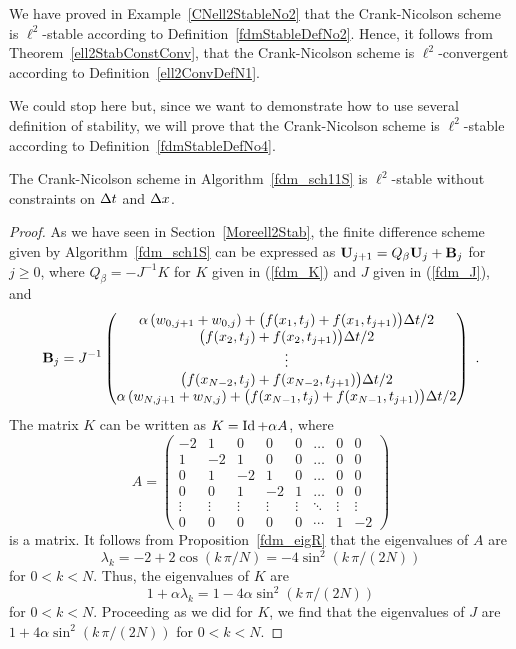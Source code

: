 We have proved in Example~\ref{CNell2StableNo2} that the
Crank-Nicolson scheme is $\ell^2$-stable according to
Definition~\ref{fdmStableDefNo2}.  Hence, it follows from
Theorem~\ref{ell2StabConstConv}, that the Crank-Nicolson scheme is
$\ell^2$-convergent according to Definition~\ref{ell2ConvDefN1}.

We could stop here but, since we want to demonstrate how to use
several definition of stability, we will prove that the Crank-Nicolson
scheme is $\ell^2$-stable according to Definition~\ref{fdmStableDefNo4}.

\begin{prop}
The Crank-Nicolson scheme in Algorithm~\ref{fdm_sch11S} is
$\ell^2$-stable without constraints on $\Delta{t}$ and $\Delta{x}$.
\end{prop}

\begin{proof}
As we have seen in Section~\ref{Moreell2Stab}, the finite difference
scheme given by Algorithm~\ref{fdm_sch1S} can be expressed as
$\mathbf{U}_{j+1} = Q_\beta\mathbf{U}_j + \mathbf{B}_j$ for $j\geq 0$, where
$Q_\beta = -J^{-1}K$ for $K$ given in (\ref{fdm_K}) and $J$ given in
(\ref{fdm_J}), and 
\[
\mathbf{B}_j = J^{-1} \begin{pmatrix}
\alpha \left( w_{0,j+1} + w_{0,j} \right)
+ \big( f(x_1,t_j) + f(x_1,t_{j+1}) \big)\Delta{t}/2 \\
\big( f(x_2,t_j) + f(x_2,t_{j+1}) \big)\Delta{t}/2 \\
\vdots \\
\big( f(x_{N-2},t_j) + f(x_{N-2},t_{j+1}) \big)\Delta{t}/2 \\
\alpha \left( w_{N,j+1} + w_{N,j} \right)
+ \big( f(x_{N-1},t_j)  + f(x_{N-1},t_{j+1}) \big)\Delta{t}/2
\end{pmatrix} \ .
\]
The matrix $K$ can be written as $K = \operatorname{Id} + \alpha A$, where
\[
A = \begin{pmatrix}
-2 & 1 & 0 & 0 & 0 & \ldots & 0 & 0 \\
1 & -2 & 1 & 0 & 0 & \ldots & 0 & 0  \\
0 & 1 & -2 & 1 & 0 & \ldots & 0 & 0 \\
0 & 0 & 1 & -2 & 1 & \ldots & 0 & 0 \\
\vdots & \vdots & \vdots & \vdots & \vdots & \ddots & \vdots & \vdots \\
0 & 0 & 0 & 0 & 0 & \cdots & 1 & -2
\end{pmatrix}
\]
is a  matrix.  It follows from
Proposition~\ref{fdm_eigR} that the eigenvalues of $A$ are
\[
\lambda_k = -2 + 2 \cos\left(k\,\pi/N\right)
= -4 \sin^2\left(k \,\pi/(2N)\right)
\]
for $0 < k < N$.  Thus, the eigenvalues of $K$ are
\[
  1+\alpha \lambda_k = 1 - 4 \alpha \sin^2\left(k\,\pi/(2N)\right)
\]
for $0 < k < N$.  Proceeding as we did for $K$, we find that the
eigenvalues of $J$ are
$\displaystyle 1 + 4 \alpha \sin^2\left(k\,\pi/(2N)\right)$
for $0 < k < N$.


\end{proof}
